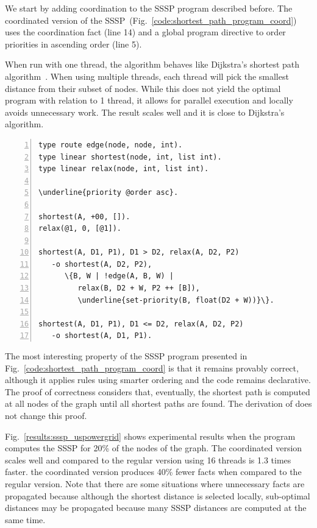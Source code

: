 We start by adding coordination to the SSSP program described before.
The coordinated version of the
SSSP~(Fig.~\ref{code:shortest_path_program_coord}) uses the coordination fact
 (line 14) and a global program directive to order
priorities in ascending order (line 5).

When run with one thread, the algorithm behaves like
Dijkstra's shortest path algorithm~\cite{Dijkstra}. When using multiple
threads, each thread will pick the smallest distance from their subset of nodes.
While this does not yield the optimal program with relation to 1 thread, it
allows for parallel execution and locally avoids unnecessary work. The result
scales well and it is close to Dijkstra's algorithm.

\begin{topfig}
\scriptsize\begin{Verbatim}[numbers=left,xleftmargin=7mm,commandchars=\\\{\}]
type route edge(node, node, int).
type linear shortest(node, int, list int).
type linear relax(node, int, list int).

\underline{priority @order asc}.

shortest(A, +00, []).
relax(@1, 0, [@1]).

shortest(A, D1, P1), D1 > D2, relax(A, D2, P2)
   -o shortest(A, D2, P2),
      \{B, W | !edge(A, B, W) |
         relax(B, D2 + W, P2 ++ [B]),
         \underline{set-priority(B, float(D2 + W))}\}.

shortest(A, D1, P1), D1 <= D2, relax(A, D2, P2)
   -o shortest(A, D1, P1).
\end{Verbatim}
\end{topfig}
\normalsize

The most interesting property of the SSSP program presented in
Fig.~\ref{code:shortest_path_program_coord} is that it remains provably correct,
although it applies rules using smarter ordering and the code remains
declarative. The proof of correctness considers that, eventually, the shortest
path is computed at all nodes of the graph until all shortest paths are found.
The derivation of  does not change this
proof.

Fig.~\ref{results:sssp_uspowergrid} shows experimental results when
the program computes the SSSP for 20\% of the nodes of the graph.  The
coordinated version scales well and compared to the regular version
using 16 threads is 1.3 times faster.  the coordinated version
produces 40\% fewer facts when compared to the regular version.
Note that there are some situations where unnecessary facts are
propagated because although the shortest distance is selected locally,
sub-optimal distances may be propagated because many SSSP distances
are computed at the same time.

